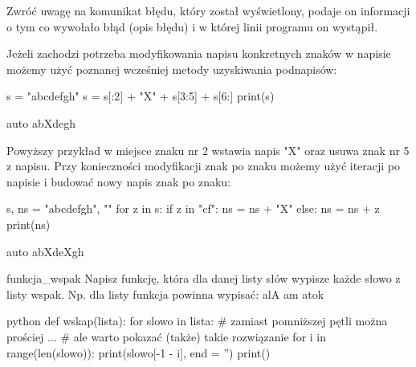 \documentclass{pdfBooklets}
\begin{document}
Zwróć uwagę na komunikat błędu, który został wyświetlony, podaje on informacji o tym co wywołało błąd (opis błędu) i w  której linii programu on wystąpił.


Jeżeli zachodzi potrzeba modyfikowania napisu konkretnych znaków w napisie możemy użyć poznanej wcześniej metody uzyskiwania podnapisów:

\begin{CodeFrame}[python]{0.50\textwidth}
s = "abcdefgh"
s = s[:2] + "X" + s[3:5] + s[6:]
print(s)
\end{CodeFrame}
\begin{CodeFrame}{auto}
abXdegh
\end{CodeFrame}

Powyższy przykład w miejsce znaku nr 2 wstawia napis "X" oraz usuwa znak nr 5 z napisu.
Przy konieczności modyfikacji znak po znaku możemy użyć iteracji po napisie i budować nowy napis znak po znaku:

\begin{CodeFrame}[python]{0.50\textwidth}
s, ns = "abcdefgh", ""
for z in s:
    if z in "cf":
        ns = ns + "X"
    else:
        ns = ns + z
print(ns)
\end{CodeFrame}
\begin{CodeFrame}{auto}
abXdeXgh
\end{CodeFrame}

\begin{Zadanie}{}{funkcja_wspak}
Napisz funkcję, która dla danej listy słów wypisze każde słowo z listy wspak. Np. dla listy  funkcja powinna wypisać:
{ \ttfamily alA am atok }

\begin{rozwiazanie}{python}
def wskap(lista):
  for slowo in lista:
    # zamiast pomniższej pętli można prościej ...
    # ale warto pokazać (także) takie rozwiązanie
    for i in range(len(slowo)):
      print(slowo[-1 - i], end = '')
    print()
\end{rozwiazanie}
\end{Zadanie}
\end{document}
